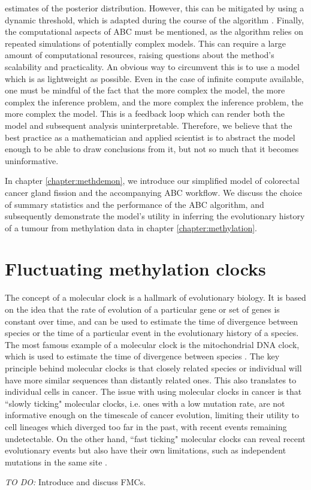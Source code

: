 estimates of the posterior distribution. However, this can be mitigated by using a dynamic threshold, which is
adapted during the course of the algorithm \cite{prangle_adapting_2017}.
Finally, the computational aspects of ABC must be mentioned, as the algorithm relies on repeated simulations of
potentially complex models. This can require a large amount of computational resources, raising questions about
the method's scalability and practicality. An obvious way to circumvent this is to use a model which is as
lightweight as possible. Even in the case of infinite compute available, one must be mindful of the fact that
the more complex the model, the more complex the inference problem, and the more complex the inference problem,
the more complex the model. This is a feedback loop which can render both the model and subsequent analysis
uninterpretable. Therefore, we believe that the best practice as a mathematician and applied scientist is to abstract
the model enough to be able to draw conclusions from it, but not so much that it becomes uninformative. \par
In chapter \ref{chapter:methdemon}, we introduce our simplified model of colorectal cancer gland fission and
the accompanying ABC workflow. We discuss the choice of summary statistics and the performance of the ABC
algorithm, and subsequently demonstrate the model's utility in inferring the evolutionary history of a tumour
from methylation data in chapter \ref{chapter:methylation}.


\section{Fluctuating methylation clocks}
The concept of a molecular clock is a hallmark of evolutionary biology. It is based on the idea that the
rate of evolution of a particular gene or set of genes is constant over time, and can be used to estimate
the time of divergence between species or the time of a particular event in the evolutionary history of a
species. The most famous example of a molecular clock is the mitochondrial DNA clock, which is used to
estimate the time of divergence between species \cite{hasegawa_dating_1985}. The key principle behind molecular
clocks is that closely related species or individual will have more similar sequences than distantly related
ones. This also translates to individual cells in cancer. The issue with using molecular clocks in cancer
is that ``slowly ticking" molecular clocks, i.e. ones with a low mutation rate, are not informative enough
on the timescale of cancer evolution, limiting their utility to cell lineages which diverged too far in the past,
with recent events remaining undetectable. On the other hand, ``fast ticking" molecular clocks can
reveal recent evolutionary events but also have their own limitations, such as independent mutations in the
same site \cite{kuipers_single-cell_2017}. \par
\textit{TO DO:} Introduce and discuss FMCs.




